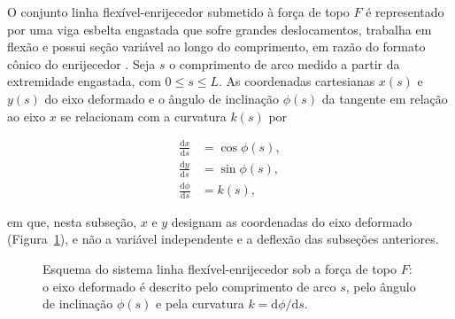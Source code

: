 \documentclass[arial,centeredequations,english,brazilian,oneside,section=TITLE]{ifes8}
\begin{document}
O conjunto linha flexível-enrijecedor submetido à força de topo $F$ é representado por
uma viga esbelta engastada que sofre grandes deslocamentos, trabalha em flexão e possui
seção variável ao longo do comprimento, em razão do formato cônico do enrijecedor
\cite{Caire2005}. Seja $s$ o comprimento de arco medido a partir da extremidade
engastada, com $0 \le s \le L$. As coordenadas cartesianas $x(s)$ e $y(s)$ do eixo
deformado e o ângulo de inclinação $\phi(s)$ da tangente em relação ao eixo $x$ se
relacionam com a curvatura $k(s)$ por \cite{Caire2005}

\begin{align}
  \frac{\mathrm{d}x}{\mathrm{d}s} &= \cos\phi(s), \label{eq:geo-x}\\
  \frac{\mathrm{d}y}{\mathrm{d}s} &= \sin\phi(s), \label{eq:geo-y}\\
  \frac{\mathrm{d}\phi}{\mathrm{d}s} &= k(s), \label{eq:geo-phi}
\end{align}

em que, nesta subseção, $x$ e $y$ designam as coordenadas do eixo deformado
(Figura~\ref{fig:esquema-enrijecedor}), e não a variável independente e a deflexão das
subseções anteriores.
 
\begin{figure}[h]
  \centering
  \caption{Esquema do sistema linha flexível-enrijecedor sob a força de topo $F$: o eixo
    deformado é descrito pelo comprimento de arco $s$, pelo ângulo de inclinação $\phi(s)$
    e pela curvatura $k = \mathrm{d}\phi/\mathrm{d}s$.}
  \label{fig:esquema-enrijecedor}
\end{figure}
 
\end{document}
